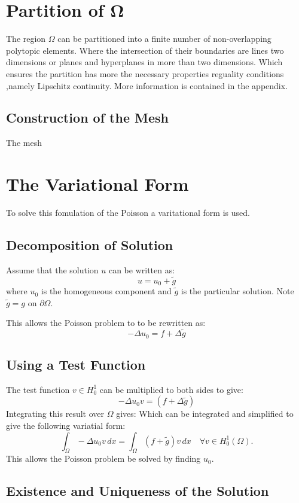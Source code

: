 \documentclass{report}
\begin{document}
\section{Partition of $\boldsymbol{\Omega}$}
The region $\Omega$ can be partitioned into a finite number of non-overlapping polytopic elements. Where the intersection of their boundaries are lines two dimensions or planes and hyperplanes in more than two dimensions. Which ensures the partition has more the necessary properties reguality conditions ,namely Lipschitz continuity. More information is contained in the appendix.

\subsection{Construction of the Mesh}
The mesh 

\section{The Variational Form}
To solve this fomulation of the Poisson a varitational form is used. 

\subsection{Decomposition of Solution}
Assume that the solution $u$ can be written as:
$$ u = u_0 +\tilde{g} $$
where $u_0$ is the homogeneous component and $\tilde{g}$ is the particular solution. Note $\tilde{g} = g$ on $\partial\Omega.$

This allows the Poisson problem to to be rewritten as:
$$-\Delta u_0 = f + \Delta\tilde{g}$$

\subsection{Using a Test Function}
The test function $v \in H_0^1$ can be multiplied to both sides to give:
$$ -\Delta u_0 v = (f+\Delta\tilde{g})$$
Integrating this result over $\Omega$ gives:
Which can be integrated and simplified to give the following variatial form:
\begin{equation}
    \int_{\Omega}-\Delta u_0v\,dx = \int_{\Omega}(f+\tilde{g})v\,dx \quad \forall v \in H_0^1(\Omega).
\end{equation}
This allows the Poisson problem be solved by finding $u_0.$


\subsection{Existence and Uniqueness of the Solution}
\end{document}
